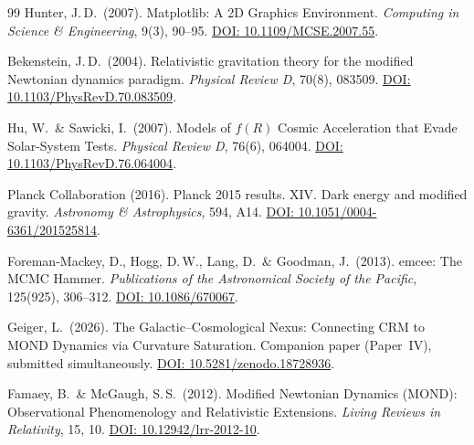 \documentclass[aps,prd,twocolumn,superscriptaddress,nofootinbib,floatfix]{revtex4-2}
\begin{document}
\begin{thebibliography}{99}
Hunter, J.\,D.\ (2007).
Matplotlib: A 2D Graphics Environment.
\textit{Computing in Science \& Engineering}, 9(3), 90--95.
\href{https://doi.org/10.1109/MCSE.2007.55}{DOI: 10.1109/MCSE.2007.55}.

Bekenstein, J.\,D.\ (2004).
Relativistic gravitation theory for the modified Newtonian dynamics paradigm.
\textit{Physical Review D}, 70(8), 083509.
\href{https://doi.org/10.1103/PhysRevD.70.083509}{DOI: 10.1103/PhysRevD.70.083509}.

Hu, W.\ \& Sawicki, I.\ (2007).
Models of $f(R)$ Cosmic Acceleration that Evade Solar-System Tests.
\textit{Physical Review D}, 76(6), 064004.
\href{https://doi.org/10.1103/PhysRevD.76.064004}{DOI: 10.1103/PhysRevD.76.064004}.

Planck Collaboration (2016).
Planck 2015 results. XIV. Dark energy and modified gravity.
\textit{Astronomy \& Astrophysics}, 594, A14.
\href{https://doi.org/10.1051/0004-6361/201525814}{DOI: 10.1051/0004-6361/201525814}.

Foreman-Mackey, D., Hogg, D.\,W., Lang, D.\ \& Goodman, J.\ (2013).
emcee: The MCMC Hammer.
\textit{Publications of the Astronomical Society of the Pacific}, 125(925), 306--312.
\href{https://doi.org/10.1086/670067}{DOI: 10.1086/670067}.

Geiger, L.\ (2026).
The Galactic--Cosmological Nexus: Connecting CRM to MOND Dynamics via Curvature Saturation.
Companion paper (Paper~IV), submitted simultaneously. \href{https://doi.org/10.5281/zenodo.18728936}{DOI: 10.5281/zenodo.18728936}.

Famaey, B.\ \& McGaugh, S.\,S.\ (2012).
Modified Newtonian Dynamics (MOND): Observational Phenomenology and Relativistic Extensions.
\textit{Living Reviews in Relativity}, 15, 10.
\href{https://doi.org/10.12942/lrr-2012-10}{DOI: 10.12942/lrr-2012-10}.

\end{thebibliography}
\end{document}
